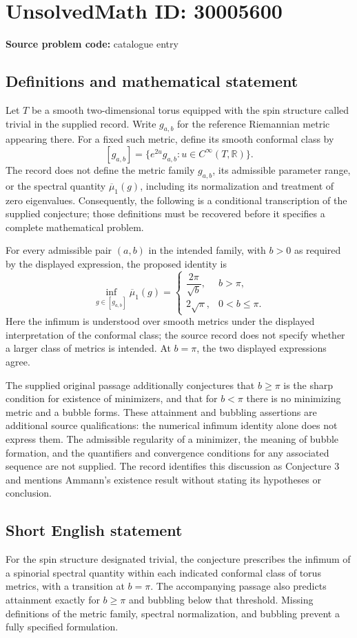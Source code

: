 \documentclass[11pt]{article}
\newcommand{\R}{\mathbb{R}}
\begin{document}
\section*{UnsolvedMath ID: 30005600}
\textbf{Source problem code:} catalogue entry
\subsection{Definitions and mathematical statement}
Let \(T\) be a smooth two-dimensional torus equipped with the spin structure called trivial in the supplied record. Write \(g_{a,b}\) for the reference Riemannian metric appearing there. For a fixed such metric, define its smooth conformal class by
\[
[g_{a,b}]=\{e^{2u}g_{a,b}:u\in C^\infty(T,\R)\}.
\]
The record does not define the metric family \(g_{a,b}\), its admissible parameter range, or the spectral quantity \(\overline\mu_1(g)\), including its normalization and treatment of zero eigenvalues. Consequently, the following is a conditional transcription of the supplied conjecture; those definitions must be recovered before it specifies a complete mathematical problem.

For every admissible pair \((a,b)\) in the intended family, with \(b>0\) as required by the displayed expression, the proposed identity is
\[
\inf_{g\in[g_{a,b}]}\overline\mu_1(g)
=
\begin{cases}
\dfrac{2\pi}{\sqrt b},&b>\pi,\\[4pt]
2\sqrt\pi,&0<b\leq\pi.
\end{cases}
\]
Here the infimum is understood over smooth metrics under the displayed interpretation of the conformal class; the source record does not specify whether a larger class of metrics is intended. At \(b=\pi\), the two displayed expressions agree.

The supplied original passage additionally conjectures that \(b\geq\pi\) is the sharp condition for existence of minimizers, and that for \(b<\pi\) there is no minimizing metric and a bubble forms. These attainment and bubbling assertions are additional source qualifications: the numerical infimum identity alone does not express them. The admissible regularity of a minimizer, the meaning of bubble formation, and the quantifiers and convergence conditions for any associated sequence are not supplied. The record identifies this discussion as Conjecture 3 and mentions Ammann's existence result without stating its hypotheses or conclusion.
\subsection{Short English statement}
For the spin structure designated trivial, the conjecture prescribes the infimum of a spinorial spectral quantity within each indicated conformal class of torus metrics, with a transition at \(b=\pi\). The accompanying passage also predicts attainment exactly for \(b\geq\pi\) and bubbling below that threshold. Missing definitions of the metric family, spectral normalization, and bubbling prevent a fully specified formulation.
\end{document}
